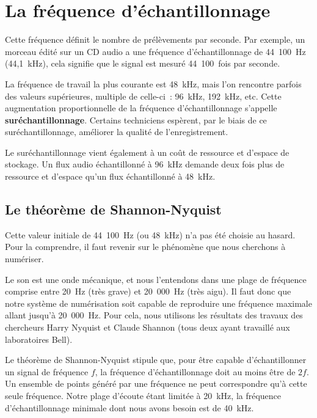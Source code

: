 \documentclass[
]{book}
\begin{document}
\hypertarget{la-fruxe9quence-duxe9chantillonnage}{%
\section{La fréquence d'échantillonnage}\label{la-fruxe9quence-duxe9chantillonnage}}

Cette fréquence définit le nombre de prélèvements par seconde. Par exemple, un morceau édité sur un CD audio a une fréquence d'échantillonnage de 44~100~Hz (44,1~kHz), cela signifie que le signal est mesuré 44~100~fois par seconde.

La fréquence de travail la plus courante est 48~kHz, mais l'on rencontre parfois des valeurs supérieures, multiple de celle-ci~: 96~kHz, 192~kHz, etc. Cette augmentation proportionnelle de la fréquence d'échantillonnage s'appelle \textbf{suréchantillonnage}. Certains techniciens espèrent, par le biais de ce suréchantillonnage, améliorer la qualité de l'enregistrement.

Le suréchantillonnage vient également à un coût de ressource et d'espace de stockage. Un flux audio échantillonné à 96~kHz demande deux fois plus de ressource et d'espace qu'un flux échantillonné à 48~kHz.

\hypertarget{le-thuxe9oruxe8me-de-shannon-nyquist}{%
\subsection{Le théorème de Shannon-Nyquist}\label{le-thuxe9oruxe8me-de-shannon-nyquist}}

Cette valeur initiale de 44~100~Hz (ou 48~kHz) n'a pas été choisie au hasard. Pour la comprendre, il faut revenir sur le phénomène que nous cherchons à numériser.

Le son est une onde mécanique, et nous l'entendons dans une plage de fréquence comprise entre 20~Hz (très grave) et 20~000~Hz (très aigu). Il faut donc que notre système de numérisation soit capable de reproduire une fréquence maximale allant jusqu'à 20~000~Hz. Pour cela, nous utilisons les résultats des travaux des chercheurs Harry Nyquist et Claude Shannon (tous deux ayant travaillé aux laboratoires Bell).

Le théorème de Shannon-Nyquist stipule que, pour être capable d'échantillonner un signal de fréquence \(f\), la fréquence d'échantillonnage doit au moins être de \(2f\). Un ensemble de points généré par une fréquence ne peut correspondre qu'à cette seule fréquence. Notre plage d'écoute étant limitée à 20~kHz, la fréquence d'échantillonnage minimale dont nous avons besoin est de 40~kHz.
\end{document}
